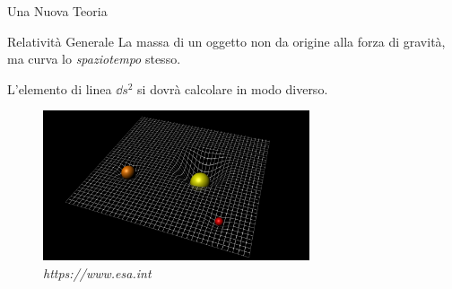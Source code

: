 \begin{frame}{Una Nuova Teoria}

    \begin{block}{Relatività Generale}
        {La massa di un oggetto non da origine alla forza di gravità, ma curva
        lo \textit{spaziotempo} stesso.}
    \end{block}

    L'elemento di linea $\dd s^2$ si dovrà calcolare in modo diverso.

    \begin{figure}
        \centering
        \includegraphics[width=0.7\textwidth]{Figures/intro/spacetime_curvature.jpg}
        \caption{\textit{https://www.esa.int}}%
    \end{figure}

\end{frame}


